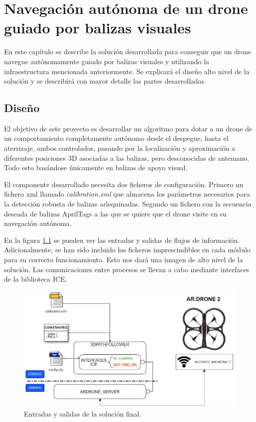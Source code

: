 \chapter{Navegación autónoma de un drone guiado por balizas visuales}\label{cap.desarrollo}
En este capítulo se describe la solución desarrollada para conseguir que un drone navegue autónomamente guiado por balizas visuales y utilizando la infraestructura mencionada anteriormente. Se explicará el diseño alto nivel de la solución y se describirá con mayor detalle las partes desarrolladas.


\section{Diseño}
El objetivo de este proyecto es desarrollar un algoritmo para dotar a un drone de un comportamiento completamente autónomo desde el despegue, hasta el aterrizaje, ambos controlados, pasando por la localización y aproximación a diferentes posiciones 3D asociadas a las balizas, pero desconocidas de antemano. Todo esto basándose únicamente en balizas de apoyo visual. 

El componente desarrollado necesita dos ficheros de configuración. Primero un fichero xml llamado \textit{calibration.xml} que almacena los parámetros necesarios para la detección robusta de balizas arlequinadas. Segundo un fichero con la secuencia deseada de balizas AprilTags a las que se quiere que el drone visite en su navegación autónoma.

En la figura \ref{fig:Solucion final} se pueden ver las entradas y salidas de flujos de información. Adicionalmente, se han sido incluido los ficheros  imprescindibles en cada módulo para su correcto funcionamiento. Esto nos dará una imagen de alto nivel de la solución. Las comunicaciones entre procesos se llevan a cabo mediante interfaces de la biblioteca ICE. 

\begin{figure}[H]
	\begin{center}	
	\includegraphics[scale=0.6]{imag/desgin_escenario.jpg}
	\caption{Entradas y salidas de la solución final.}
	\label{fig:Solucion final}
	\end{center}
\end{figure}


